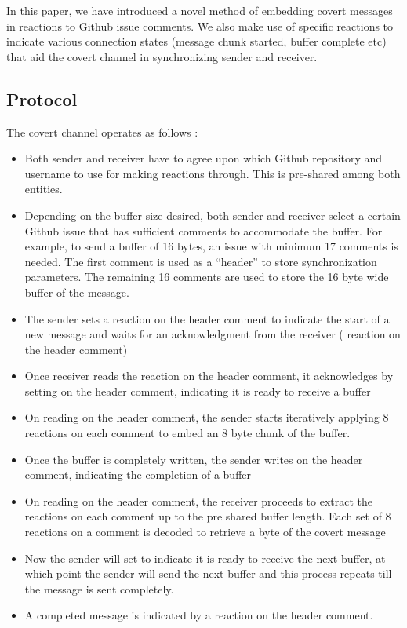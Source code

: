 \documentclass[conference]{IEEEtran}
\begin{document}
In this paper, we have introduced a novel method of embedding covert messages in reactions to Github issue comments. We also make use of specific reactions to indicate various connection states (message chunk started, buffer complete etc) that aid the covert channel in synchronizing sender and receiver. 

\subsection{Protocol}\label{AA}
The covert channel operates as follows : 
\begin{itemize}
\item Both sender and receiver have to agree upon which Github repository and username to use for making reactions through. This is pre-shared among both entities.
\item Depending on the buffer size desired, both sender and receiver select a certain Github issue that has sufficient comments to accommodate the buffer. For example, to send a buffer of 16 bytes, an issue with minimum 17 comments is needed. The first comment is used as a “header” to store synchronization parameters. The remaining 16 comments are used to store the 16 byte wide buffer of the message.
\item The sender sets a  reaction on the header comment to indicate the start of a new message and waits for an acknowledgment from the receiver ( reaction on the header comment)
\item Once receiver reads the  reaction on the header comment, it acknowledges by setting  on the header comment, indicating it is ready to receive a buffer
\item On reading  on the header comment, the sender starts iteratively applying 8 reactions on each comment to embed an 8 byte chunk of the buffer.
\item Once the buffer is completely written, the sender writes  on the header comment, indicating the completion of a buffer
\item On reading  on the header comment, the receiver proceeds to extract the reactions on each comment up to the pre shared buffer length. Each set of 8 reactions on a comment is decoded to retrieve a byte of the covert message
\item Now the sender will set  to indicate it is ready to receive the next buffer, at which point the sender will send the next buffer and this process repeats till the message is sent completely.
\item A completed message is indicated by a  reaction on the header comment.
\end{itemize}
\end{document}
